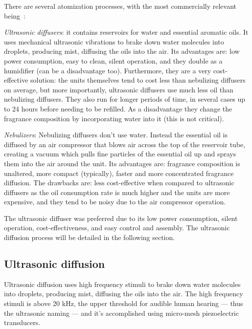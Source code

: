 There are several atomization processes, with the most commercially relevant being~\cite{aromaUltrasonicVsNebul}:
\begin{item-c}
\item \emph{Ultrasonic diffusers}: it contains reservoirs for water and
  essential aromatic oils. It uses mechanical ultrasonic vibrations to
  brake down water molecules into droplets, producing mist, diffusing the oils
  into the air. Its advantages are: low power consumption, easy to clean,
  silent operation, and
  they double as a humidifier (can be a disadvantage too). Furthermore, they are
  a very cost-effective solution: the units themselves tend to cost less than
  nebulizing diffusers on average, but more importantly, ultrasonic diffusers
  use much less oil than nebulizing diffusers. They also run for longer periods
  of time, in several cases up to 24 hours before needing to be refilled.
  As a disadvantage they change the fragrance composition by incorporating water
  into it (this is not critical).
\item \emph{Nebulizers}:
  Nebulizing diffusers don't use water. Instead the essential oil is diffused by
  an air compressor that blows air across the top of the reservoir tube,
  creating a vacuum which pulls fine particles of the essential oil up and
  sprays them into the air around the unit. Its advantages are: fragrance
  composition is unaltered, more compact (typically), faster and more
  concentrated fragrance diffusion. The drawbacks are: less cost-effective when
  compared to ultrasonic diffusers as the oil consumption rate is much higher
  and the units are more expensive, and they tend to be noisy due to the air
  compressor operation.
\end{item-c}

The ultrasonic diffuser was preferred due to its low power consumption, silent
operation, cost-effectiveness, and easy control and assembly. The ultrasonic
diffusion process will be detailed in the following section.

\subsection{Ultrasonic diffusion}
\label{sec:ultrasonic-diffusion}
Ultrasonic diffusion uses high frequency stimuli to brake down water molecules
into droplets, producing mist, diffusing the oils into the air. The high
frequency stimuli is above 20 kHz, the upper threshold
for audible human hearing --- thus the ultrasonic naming --- and it's
accomplished using micro-mesh piezoelectric transducers.

